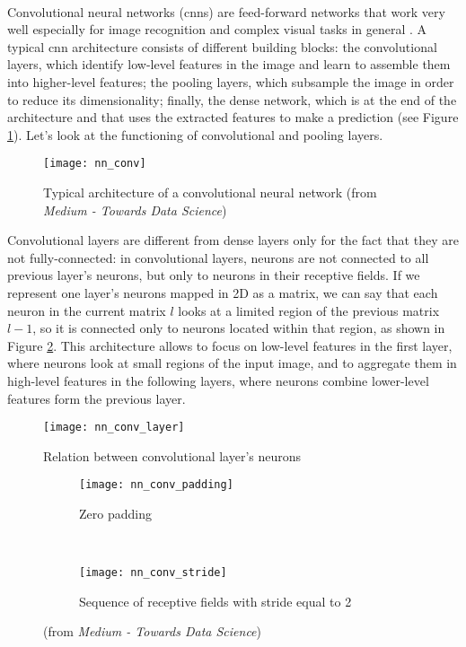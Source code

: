 \paragraph{} Convolutional neural networks (\acsp{cnn}) are feed-forward networks that work very well especially for image recognition and complex visual tasks in general \cite{OReilly:handsonML}. A typical \acs{cnn} architecture consists of different building blocks: the convolutional layers, which identify low-level features in the image and learn to assemble them into higher-level features; the pooling layers, which subsample the image in order to reduce its dimensionality; finally, the dense network, which is at the end of the architecture and that uses the extracted features to make a prediction (see Figure \ref{fig:nn_conv}). Let's look at the functioning of convolutional and pooling layers.
\begin{figure}[htbp]
    \centering
    \texttt{[image: nn\_conv]}
    \caption{Typical architecture of a convolutional neural network (from \textit{Medium - Towards Data Science})}
    \label{fig:nn_conv}
\end{figure}

Convolutional layers are different from dense layers only for the fact that they are not fully-connected: in convolutional layers, neurons are not connected to all previous layer's neurons, but only to neurons in their receptive fields. If we represent one layer's neurons mapped in 2D as a matrix, we can say that each neuron in the current matrix $l$ looks at a limited region of the previous matrix $l-1$, so it is connected only to neurons located within that region, as shown in Figure \ref{fig:nn_conv_layer}. This architecture allows to focus on low-level features in the first layer, where neurons look at small regions of the input image, and to aggregate them in high-level features in the following layers, where neurons combine lower-level features form the previous layer.
\begin{figure}[htbp]
    \centering
    \texttt{[image: nn\_conv\_layer]}
    \caption{Relation between convolutional layer's neurons}
    \label{fig:nn_conv_layer}
\end{figure}

\begin{figure}[htbp]
    \centering
    \begin{subfigure}[t]{0.25\textwidth}
		\texttt{[image: nn\_conv\_padding]}
        \caption{Zero padding}
        \label{fig:nn_conv_padding}
	\end{subfigure}
	~
	\begin{subfigure}[t]{0.8\textwidth}
		\texttt{[image: nn\_conv\_stride]}
        \caption{Sequence of receptive fields with stride equal to 2}
        \label{fig:nn_conv_stride}
    \end{subfigure}
    \caption{(from \textit{Medium - Towards Data Science})}
    \label{fig:padding_stride}
\end{figure}

